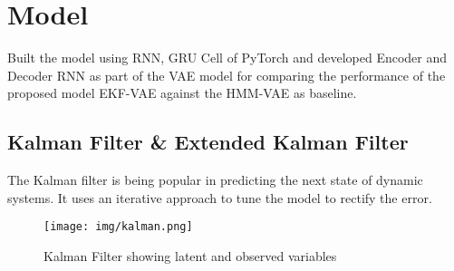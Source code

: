 \documentclass{article}
\begin{document}
\section{Model}
\label{section:model}

Built the model using RNN, GRU Cell of PyTorch and developed Encoder and Decoder RNN as part of the VAE model for comparing the performance of the proposed model EKF-VAE against the HMM-VAE as baseline. 

\subsection{Kalman Filter \& Extended Kalman Filter} 
The Kalman filter \cite{SSS06Oxford} is being popular in predicting the next state of dynamic systems. It uses an iterative approach to tune the model to rectify the error. 

\begin{figure}[H]
  \centering
  \texttt{[image: img/kalman.png]}
  \caption{ Kalman Filter showing latent and observed variables}
  \label{fig:fig2}
\end{figure}
\end{document}
